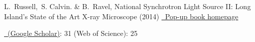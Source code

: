 \documentclass[11pt]{moderncv}
\begin{document}
%
{\small L.\ Russell,\ S. Calvin. \& B.\ Ravel, National Synchrotron
  Light Source II: Long Island's State of the Art X-ray Microscope
  (2014)
  \href{http://bruceravel.github.io/synchrotron_pop_up_book/}
  {\color{color2}\homepagesymbol~Pop-up book homepage}}

%
{\small \href{http://scholar.google.com/citations?user=41rV5koAAAAJ}
  {\color{color2}\homepagesymbol~(Google Scholar)}: 31 \qquad
  (Web of Science): 25}
\fi

\nocite{*}


\end{document}
